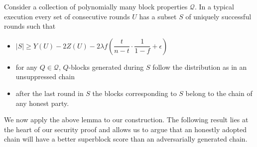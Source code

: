 \begin{lemma}[Unsuppressibility]
    Consider a collection of polynomially many block properties $\mathcal{Q}$. In a typical execution every set of consecutive rounds $U$ has a subset $S$ of uniquely successful rounds such that
    \begin{itemize}
        \item $\lvert S \rvert \geq Y(U) - 2Z(U) - 2 \lambda f (\dfrac{t}{n-t} \cdot \dfrac{1}{1-f} + \epsilon)$
        \item for any $Q \in \mathcal{Q}$, $Q$-blocks generated during $S$ follow the distribution as in an unsuppressed chain
        \item after the last round in $S$ the blocks corresponding to $S$ belong
        to the chain of any honest party.
    \end{itemize}
\end{lemma}

We now apply the above lemma to our construction. The following result lies at
the heart of our security proof and allows us to argue that an honestly adopted
chain will have a better superblock score than an adversarially generated chain.

